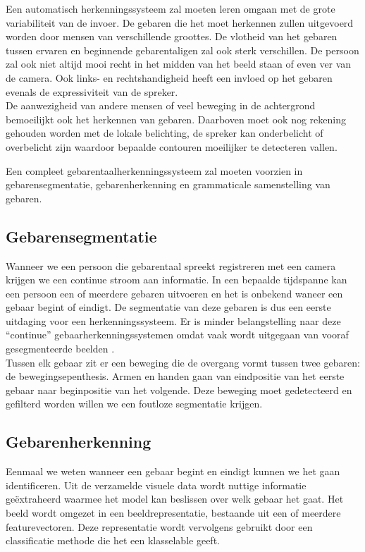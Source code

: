\npar Een automatisch herkenningssysteem zal moeten leren omgaan met de grote variabiliteit van de invoer. De gebaren die het moet herkennen zullen uitgevoerd worden door mensen van verschillende groottes. De vlotheid van het gebaren tussen ervaren en beginnende gebarentaligen zal ook sterk verschillen. De persoon zal ook niet altijd mooi recht in het midden van het beeld staan of even ver van de camera. Ook links- en rechtshandigheid heeft een invloed op het gebaren evenals de expressiviteit van de spreker.
\\ De aanwezigheid van andere mensen of veel beweging in de achtergrond bemoeilijkt ook het herkennen van gebaren. Daarboven moet ook nog rekening gehouden worden met de lokale belichting, de spreker kan onderbelicht of overbelicht zijn waardoor bepaalde contouren moeilijker te detecteren vallen.

\npar Een compleet gebarentaalherkenningssysteem zal moeten voorzien in gebarensegmentatie, gebarenherkenning en grammaticale samenstelling van gebaren.

\subsection{Gebarensegmentatie}
\npar Wanneer we een persoon die gebarentaal spreekt registreren met een camera krijgen we een continue stroom aan informatie. In een bepaalde tijdspanne kan een persoon een of meerdere gebaren uitvoeren en het is onbekend waneer een gebaar begint of eindigt. De segmentatie van deze gebaren is dus een eerste uitdaging voor een herkenningssysteem. Er is minder belangstelling naar deze ``continue'' gebaarherkenningssystemen omdat vaak wordt uitgegaan van vooraf gesegmenteerde beelden \cite{hmdb-manual-segm}.
\\ Tussen elk gebaar zit er een beweging die de overgang vormt tussen twee gebaren: de bewegingsepenthesis. Armen en handen gaan van eindpositie van het eerste gebaar naar beginpositie van het volgende. \cite{movement-epenthesis} Deze beweging moet gedetecteerd en gefilterd worden willen we een foutloze segmentatie krijgen.

\subsection{Gebarenherkenning}
Eenmaal we weten wanneer een gebaar begint en eindigt kunnen we het gaan identificeren. Uit de verzamelde visuele data wordt nuttige informatie ge\"extraheerd waarmee het model kan beslissen over welk gebaar het gaat. Het beeld wordt omgezet in een beeldrepresentatie, bestaande uit een of meerdere featurevectoren. Deze representatie wordt vervolgens gebruikt door een classificatie methode die het een klasselable geeft.

